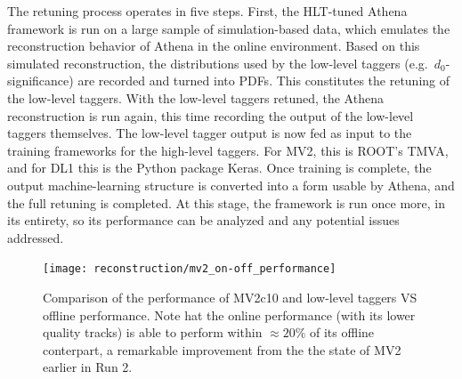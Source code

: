         The retuning process operates in five steps.
        First, the HLT-tuned Athena framework is run on a large sample of simulation-based data,
            which emulates the reconstruction behavior of Athena in the online environment.
        Based on this simulated reconstruction, the distributions used by the low-level taggers
            (e.g.\ $d_0$-significance) are recorded and turned into PDFs.
        This constitutes the retuning of the low-level taggers.
        With the low-level taggers retuned, the Athena reconstruction is run again,
            this time recording the output of the low-level taggers themselves.
        The low-level tagger output is now fed as input to the training frameworks for the high-level taggers.
        For MV2, this is ROOT's TMVA\cite{cern_root_tmva},
            and for DL1 this is the Python package Keras\cite{keras}.
        Once training is complete, the output machine-learning structure is converted into a form usable by Athena,
            and the full retuning is completed.
        At this stage, the framework is run once more, in its entirety,
            so its performance can be analyzed and any potential issues addressed.

        \begin{figure}[tbh]
            \texttt{[image: reconstruction/mv2\_on-off\_performance]}
            \caption{
                Comparison of the performance of MV2c10 and low-level taggers VS offline performance\cite{Gupta:2271945}.
                Note hat the online performance (with its lower quality tracks) is able to perform within $\approx 20\%$
                    of its offline conterpart, a remarkable improvement from the the state of MV2 earlier in Run 2.
            }
            \label{fig:mv2_performance}
        \end{figure}



